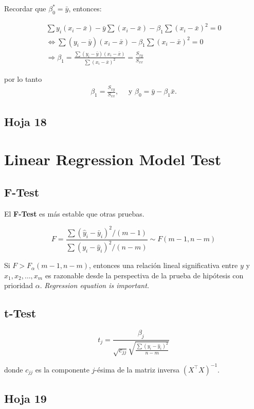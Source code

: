 \documentclass[12pt]{article}
\begin{document}
Recordar que $\beta_0^* = \bar{y}$, entonces:

\begin{eqnarray*}
\sum y_i (x_i - \bar{x}) - \bar{y} \sum (x_i - \bar{x}) - \beta_1 \sum (x_i - \bar{x})^2 = 0\\
\Leftrightarrow \sum (y_i - \bar{y})(x_i - \bar{x}) - \beta_1 \sum (x_i - \bar{x})^2 = 0\\
\Rightarrow \beta_1 = \frac{\sum (y_i - \bar{y})(x_i - \bar{x})}{\sum (x_i - \bar{x})^2} = \frac{S_{xy}}{S_{xx}}
\end{eqnarray*}

por lo tanto
\begin{eqnarray*}
\boxed{ \beta_1 = \frac{S_{xy}}{S_{xx}}, } \quad \textrm{ y }\boxed{ \beta_0 = \bar{y} - \beta_1 \bar{x}.}
\end{eqnarray*}


\subsection{Hoja 18}
\section*{Linear Regression Model Test}

\subsection*{F-Test}

El \textbf{F-Test} es más estable que otras pruebas.

\[
F = \frac{\sum (\hat{y}_i - \bar{y}_i)^2 / (m - 1)}{\sum (y_i - \hat{y}_i)^2 / (n - m)} \sim F(m - 1, n - m)
\]

Si \( F > F_\alpha(m - 1, n - m) \), entonces una relación lineal significativa entre \( y \) y \( x_1, x_2, \dots, x_m \) es razonable desde la perspectiva de la prueba de hipótesis con prioridad \( \alpha \). \textit{Regression equation is important.}

\subsection*{t-Test}

\[
t_j = \frac{\beta_j}{\sqrt{c_{jj}} \sqrt{ \frac{\sum (y_i - \hat{y}_i)^2}{n - m} }}
\]

donde \( c_{jj} \) es la componente \( j \)-ésima de la matriz inversa \( (X^\top X)^{-1} \).

\subsection{Hoja 19}
\end{document}
